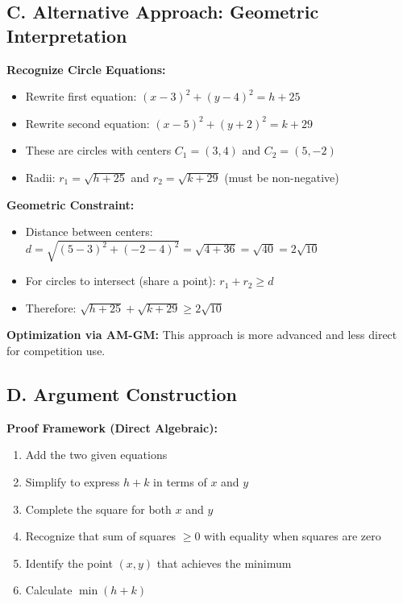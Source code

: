 \documentclass[12pt]{article}
\begin{document}
\begin{strategicbox}
\subsection*{C. Alternative Approach: Geometric Interpretation}

\textbf{Recognize Circle Equations:}
\begin{itemize}
    \item Rewrite first equation: $(x - 3)^2 + (y - 4)^2 = h + 25$
    \item Rewrite second equation: $(x - 5)^2 + (y + 2)^2 = k + 29$
    \item These are circles with centers $C_1 = (3, 4)$ and $C_2 = (5, -2)$
    \item Radii: $r_1 = \sqrt{h + 25}$ and $r_2 = \sqrt{k + 29}$ (must be non-negative)
\end{itemize}

\textbf{Geometric Constraint:}
\begin{itemize}
    \item Distance between centers: $d = \sqrt{(5-3)^2 + (-2-4)^2} = \sqrt{4 + 36} = \sqrt{40} = 2\sqrt{10}$
    \item For circles to intersect (share a point): $r_1 + r_2 \geq d$
    \item Therefore: $\sqrt{h + 25} + \sqrt{k + 29} \geq 2\sqrt{10}$
\end{itemize}

\textbf{Optimization via AM-GM:}
This approach is more advanced and less direct for competition use.

\subsection*{D. Argument Construction}

\textbf{Proof Framework (Direct Algebraic):}
\begin{enumerate}
    \item Add the two given equations
    \item Simplify to express $h + k$ in terms of $x$ and $y$
    \item Complete the square for both $x$ and $y$
    \item Recognize that sum of squares $\geq 0$ with equality when squares are zero
    \item Identify the point $(x, y)$ that achieves the minimum
    \item Calculate $\min(h + k)$
\end{enumerate}
\end{strategicbox}
\end{document}
